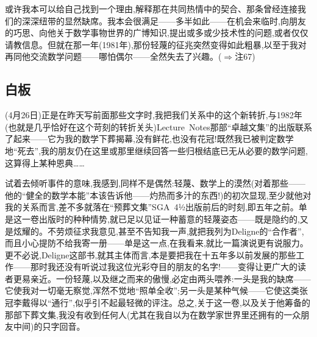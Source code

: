 或许我本可以给自己找到一个理由,解释那在共同热情中的契合、那条曾经连接我们的深深纽带的显然缺席。我本会很满足——多半如此——在机会来临时,向朋友的巧思、向他关于数学事物世界的广博知识,提出或多或少技术性的问题,或者仅仅请教信息。但就在那一年(1981年),那份轻蔑的征兆突然变得如此粗暴,以至于我对再同他交流数学问题——哪怕偶尔——全然失去了兴趣。($\Rightarrow$注67)

\subsection{白板}


(4月26日)正是在昨天写前面那些文字时,我把我们关系中的这个新转折,与1982年(也就是几乎恰好在这个苛刻的转折关头)Lecture~Notes那部“卓越文集”的出版联系了起来——它为我的数学下葬揭幕,没有鲜花,也没有花冠!既然我已被判定数学地“死去”,我的朋友仍在这里或那里继续回答一些归根结底已无从必要的数学问题,这算得上某种恩典……

\pmark {}试着去倾听事件的意味,我感到,同样不是偶然:轻蔑、数学上的漠然(对着那些——他的“健全的数学本能”本该告诉他——灼热而多汁的东西!)的初次显现,至少就他对我的关系而言,差不多就落在“预葬文集”SGA~4½出版前后的时刻,即五年之前。单是这一卷出版时的种种情势,就已足以见证一种蓄意的轻蔑姿态——既是隐约的,又是炫耀的。不劳烦征求我意见,甚至不告知我一声,就把我列为Deligne的“合作者”,而且小心提防不给我寄一册——单是这一点,在我看来,就比一篇演说更有说服力。更不必说,Deligne这部书,就其主体而言,本是要把我在十五年多以前发展的那些工作——那时我还没有听说过我这位光彩夺目的朋友的名字!——变得让更广大的读者更易亲近。一份轻蔑,以及继之而来的傲慢,必定由两头喂养:一头是我的缺席——它使我对一切毫无察觉,浑然不觉地“照单全收”;另一头是某种气候——它使这类张冠李戴得以“通行”,似乎引不起最轻微的评注。总之,关于这一卷,以及关于他筹备的那部下葬文集,我没有收到任何人(尤其在我自以为在数学家世界里还拥有的一众朋友中间)的只字回音。

